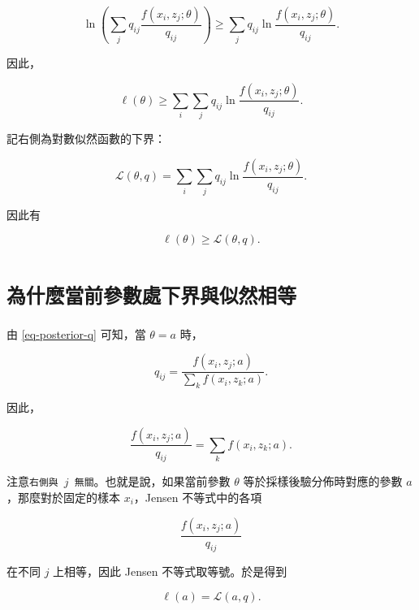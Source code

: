 \begin{equation}\label{eq-jensen-single}
\ln\left(
\sum_j q_{ij}
\frac{
f(x_i,z_j;\theta)
}{
q_{ij}
}
\right)
\ge
\sum_j
q_{ij}
\ln
\frac{
f(x_i,z_j;\theta)
}{
q_{ij}
}.
\end{equation}

因此，

\begin{equation}\label{eq-lower-bound}
\ell(\theta)
\ge
\sum_i
\sum_j
q_{ij}
\ln
\frac{
f(x_i,z_j;\theta)
}{
q_{ij}
}.
\end{equation}

記右側為對數似然函數的下界：

\begin{equation}\label{eq-lower-bound-definition}
\mathcal{L}(\theta,q)
=
\sum_i
\sum_j
q_{ij}
\ln
\frac{
f(x_i,z_j;\theta)
}{
q_{ij}
}.
\end{equation}

因此有

\begin{equation}\label{eq-ll-ge-lower-bound}
\ell(\theta)
\ge
\mathcal{L}(\theta,q).
\end{equation}

\section{\verb|為什麼當前參數處下界與似然相等|}

由 \eqref{eq-posterior-q} 可知，當 \(\theta=a\) 時，

\begin{equation}\label{eq-q-at-a}
q_{ij}
=
\frac{
f(x_i,z_j;a)
}{
\sum_k f(x_i,z_k;a)
}.
\end{equation}

因此，

\begin{equation}\label{eq-jensen-constant}
\frac{
f(x_i,z_j;a)
}{
q_{ij}
}
=
\sum_k f(x_i,z_k;a).
\end{equation}

注意\texttt{右側與 \(j\) 無關}。也就是說，如果當前參數 \(\theta\) 等於採樣後驗分佈時對應的參數 \(a\)，那麼對於固定的樣本 \(x_i\)，Jensen 不等式中的各項

\begin{equation}\label{eq-jensen-term}
\frac{
f(x_i,z_j;a)
}{
q_{ij}
}
\end{equation}

在不同 \(j\) 上相等，因此 Jensen 不等式取等號。於是得到

\begin{equation}\label{eq-tight-bound}
\ell(a)
=
\mathcal{L}(a,q).
\end{equation}


